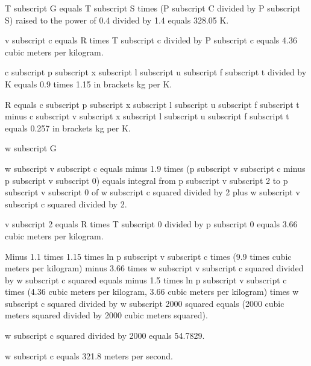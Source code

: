 T subscript G equals T subscript S times (P subscript C divided by P subscript S) raised to the power of 0.4 divided by 1.4 equals 328.05 K.

v subscript c equals R times T subscript c divided by P subscript c equals 4.36 cubic meters per kilogram.

c subscript p subscript x subscript l subscript u subscript f subscript t divided by K equals 0.9 times 1.15 in brackets kg per K.

R equals c subscript p subscript x subscript l subscript u subscript f subscript t minus c subscript v subscript x subscript l subscript u subscript f subscript t equals 0.257 in brackets kg per K.

w subscript G

w subscript v subscript c equals minus 1.9 times (p subscript v subscript c minus p subscript v subscript 0) equals integral from p subscript v subscript 2 to p subscript v subscript 0 of w subscript c squared divided by 2 plus w subscript v subscript c squared divided by 2.

v subscript 2 equals R times T subscript 0 divided by p subscript 0 equals 3.66 cubic meters per kilogram.

Minus 1.1 times 1.15 times ln p subscript v subscript c times (9.9 times cubic meters per kilogram) minus 3.66 times w subscript v subscript c squared divided by w subscript c squared equals minus 1.5 times ln p subscript v subscript c times (4.36 cubic meters per kilogram, 3.66 cubic meters per kilogram) times w subscript c squared divided by w subscript 2000 squared equals (2000 cubic meters squared divided by 2000 cubic meters squared).

w subscript c squared divided by 2000 equals 54.7829.

w subscript c equals 321.8 meters per second.